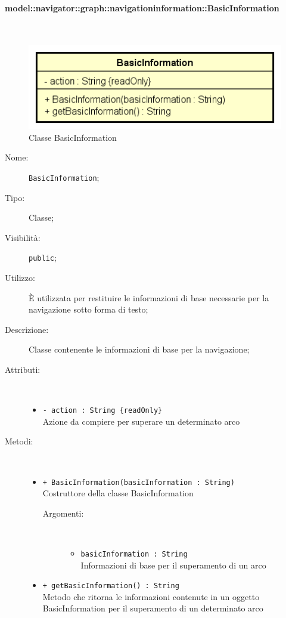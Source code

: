 \documentclass[../DefinizioneDiProdotto.tex]{subfiles}
\begin{document}
\paragraph{model::navigator::graph::navigationinformation::BasicInformation}
\
\begin{figure}[H]
	\centering
	\includegraphics[width=\maxwidth]{img/BasicInformation.png}
	\caption{Classe BasicInformation}\label{fig:model::navigator::graph::navigationinformation::BasicInformation} 
\end{figure}
\begin{description}
	\item[Nome:] \texttt{BasicInformation};
	\item[Tipo:] Classe;
	\item[Visibilità:] \texttt{public};
	\item[Utilizzo:] È utilizzata per restituire le informazioni di base necessarie per la navigazione sotto forma di testo;
	\item[Descrizione:] Classe contenente le informazioni di base per la navigazione;
	\item[Attributi:] \
	\begin{itemize}
		\item \texttt{- action : String \{readOnly\}}\\
		Azione da compiere per superare un determinato arco
		
	\end{itemize}
	\item[Metodi:] \
	\begin{itemize}
		\item \texttt{+ BasicInformation(basicInformation : String)}\\
		Costruttore della classe BasicInformation
		\begin{description}
			\item[Argomenti:] \
			\begin{itemize}
				\item \texttt{basicInformation : String}\\
				Informazioni di base per il superamento di un arco\end{itemize}
		\end{description}
		\item \texttt{+ getBasicInformation() : String}\\
		Metodo che ritorna le informazioni contenute in un oggetto BasicInformation per il superamento di un determinato arco
	\end{itemize}
\end{description}
\end{document}
